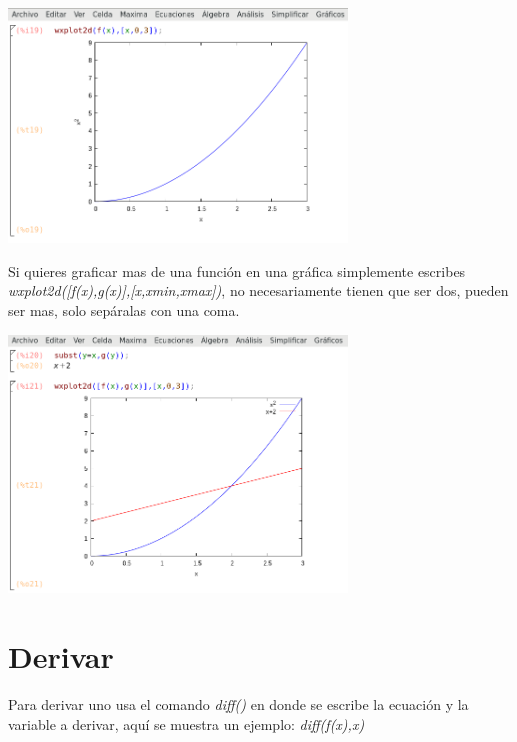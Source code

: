 \documentclass{article}
\begin{document}
\vspace{0.4cm}
\begin{center}
	\includegraphics[width=9cm]{graf1.png}
    
\end{center}
\vspace{0.4cm}

Si quieres graficar mas de una función en una gráfica simplemente escribes \textit{wxplot2d([f(x),g(x)],[x,xmin,xmax])}, no necesariamente tienen que ser dos, pueden ser mas, solo sepáralas con una coma.

\begin{center}
	\includegraphics[width=9cm]{graf2.png}
    
\end{center}
\vspace{0.3cm}



\section{Derivar}

Para derivar uno usa el comando \textit{diff()} en donde se escribe la ecuación y la variable a derivar, aquí se muestra un ejemplo: \textit{diff(f(x),x)}
\end{document}

